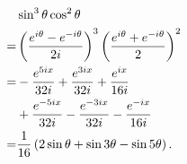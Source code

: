 \documentclass{ctexart}
\begin{document}
\begin{align*}
  &\sin^3\theta\cos^2\theta\\
  =&\left(\frac{e^{i\theta}-e^{-i\theta}}{2i}\right)^3\left(\frac{e^{i\theta}+e^{-i\theta}}{2}\right)^2\\
  =&-\frac{e^{5ix}}{32i}+\frac{e^{3ix}}{32i}+\frac{e^{ix}}{16i}\\
    &+\frac{e^{-5ix}}{32i}-\frac{e^{-3ix}}{32i}-\frac{e^{-ix}}{16i}\\
  =&\frac{1}{16}\left(2\sin\theta+\sin3\theta-\sin5\theta\right).
\end{align*}
\end{document}
